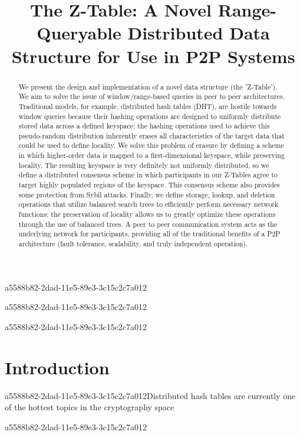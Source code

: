 \documentclass[12pt]{article}
\title{The Z-Table: A Novel Range-Queryable Distributed Data Structure for Use in P2P Systems}
\begin{document}
a5588b82-2dad-11e5-89e3-3c15c2c7a012\maketitle
a5588b82-2dad-11e5-89e3-3c15c2c7a012
\begin{abstract}
We present the design and implementation of a novel data structure (the 'Z-Table'). We aim to solve the issue of window/range-based queries in peer to peer architectures. Traditional models, for example,  distributed hash tables (DHT), are hostile towards window queries because their hashing operations are designed to uniformly distribute stored data across a defined keyspace; the hashing operations used to achieve this pseudo-random distribution inherently erases all characteristics of the target data that could be used to define locality. We solve this problem of erasure by defining a scheme in which higher-order data is mapped to a first-dimensional keyspace, while preserving locality. The resulting keyspace is very definitely not uniformly distributed, so we define a distributed consensus scheme in which participants in our Z-Tables agree to target highly populated regions of the keyspace. This consensus scheme also provides some protection from Sybil attacks. Finally, we define storage, lookup, and deletion operations that utilize balanced search trees to efficiently perform necessary network functions; the preservation of locality allows us to greatly optimize these operations through the use of balanced trees. A peer to peer communication system acts as the underlying network for participants, providing all of the traditional benefits of a P2P architecture (fault tolerance, scalability, and truly independent operation).
\end{abstract}

a5588b82-2dad-11e5-89e3-3c15c2c7a012
\newpage
\section{Introduction}
a5588b82-2dad-11e5-89e3-3c15c2c7a012Distributed hash tables are currently one of the hottest topics in the cryptography space~\cite{Stoica:2001dj,Rowstron:2001ea,Ratnasamy:2001wn}

a5588b82-2dad-11e5-89e3-3c15c2c7a012\printbibliography
\end{document}
